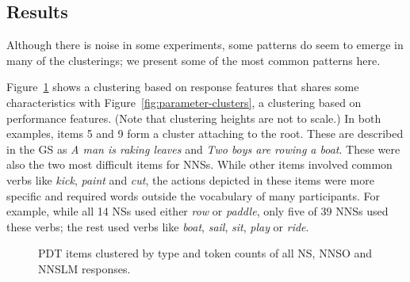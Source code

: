 \subsection{Results}
\label{sec:clusteringresults}

Although there is noise in some experiments, some patterns do seem to
emerge in many of the clusterings; we present some of the most common
patterns here.

Figure~\ref{fig:response-clusters} shows a clustering based on
response features that shares some characteristics with
Figure~\ref{fig:parameter-clusters}, a clustering based on performance
features. (Note that clustering heights are not to scale.)  In both
examples, items 5 and 9 form a cluster attaching to the root. These
are described in the GS as \textit{A man is raking leaves} and
\textit{Two boys are rowing a boat}. These were also the two most
difficult items for NNSs. While other items involved common verbs like
\textit{kick}, \textit{paint} and \textit{cut}, the actions depicted
in these items were more specific and required words outside the
vocabulary of many participants. For example, while all 14 NSs used
either \textit{row} or \textit{paddle}, only five of 39 NNSs used
these verbs; the rest used verbs like \textit{boat}, \textit{sail},
\textit{sit}, \textit{play} or \textit{ride}.

\begin{figure}
\begin{center}
\end{center}
\caption{PDT items clustered by type and token counts of all NS, NNSO and NNSLM responses.} 
\label{fig:response-clusters}
\end{figure}

